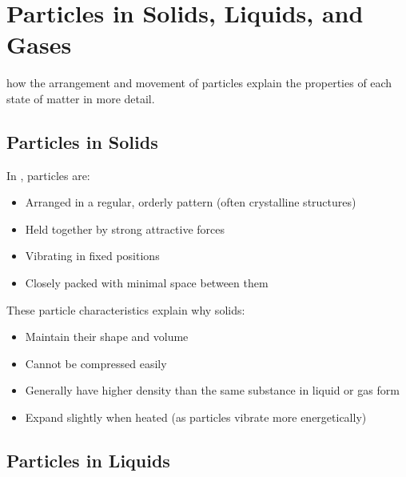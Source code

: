 
\section{Particles in Solids, Liquids, and Gases}

 how the arrangement and movement of particles explain the properties of each state of matter in more detail.

\subsection{Particles in Solids}

In , particles are:
\begin{itemize}
    \item Arranged in a regular, orderly pattern (often crystalline structures)
    \item Held together by strong attractive forces
    \item Vibrating in fixed positions
    \item Closely packed with minimal space between them
\end{itemize}

These particle characteristics explain why solids:
\begin{itemize}
    \item Maintain their shape and volume
    \item Cannot be compressed easily
    \item Generally have higher density than the same substance in liquid or gas form
    \item Expand slightly when heated (as particles vibrate more energetically)
\end{itemize}


\subsection{Particles in Liquids}

